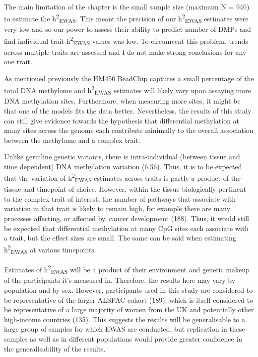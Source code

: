 \documentclass[11pt,oneside]{bristolthesis}
\begin{document}
The main limitation of the chapter is the small sample size (maximum N = 940) to estimate the h\textsuperscript{2}\textsubscript{EWAS}. This meant the precision of our h\textsuperscript{2}\textsubscript{EWAS} estimates were very low and so our power to assess their ability to predict number of DMPs and find individual trait h\textsuperscript{2}\textsubscript{EWAS} values was low. To circumvent this problem, trends across multiple traits are assessed and I do not make strong conclusions for any one trait.

As mentioned previously the HM450 BeadChip captures a small percentage of the total DNA methylome and h\textsuperscript{2}\textsubscript{EWAS} estimates will likely vary upon assaying more DNA methylation sites. Furthermore, when measuring more sites, it might be that one of the models fits the data better. Nevertheless, the results of this study can still give evidence towards the hypothesis that differential methylation at many sites across the genome each contribute minimally to the overall association between the methylome and a complex trait.

Unlike germline genetic variants, there is intra-individual (between tissue and time dependent) DNA methylation variation (6,56). Thus, it is to be expected that the variation of h\textsuperscript{2}\textsubscript{EWAS} estimates across traits is partly a product of the tissue and timepoint of choice. However, within the tissue biologically pertinent to the complex trait of interest, the number of pathways that associate with variation in that trait is likely to remain high, for example there are many processes affecting, or affected by, cancer development (188). Thus, it would still be expected that differential methylation at many CpG sites each associate with a trait, but the effect sizes are small. The same can be said when estimating h\textsuperscript{2}\textsubscript{EWAS} at various timepoints.

Estimates of h\textsuperscript{2}\textsubscript{EWAS} will be a product of their environment and genetic makeup of the participants it's measured in. Therefore, the results here may vary by population and by sex. However, participants used in this study are considered to be representative of the larger ALSPAC cohort (189), which is itself considered to be representative of a large majority of women from the UK and potentially other high-income countries (135). This suggests the results will be generalisable to a large group of samples for which EWAS are conducted, but replication in these samples as well as in different populations would provide greater confidence in the generalisability of the results.
\end{document}
